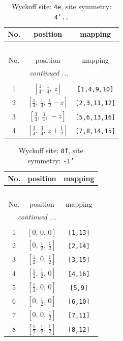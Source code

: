 \documentclass[fleqn,8pt]{jsarticle}
\begin{document}
\renewcommand{\arraystretch}{1.2}
\begin{longtable}{ccc}
\caption{Wyckoff site: {\tt 4e}, site symmetry: {\tt 4'..}}
 \\
 \hline \hline
No. & position & mapping \\ \hline \endfirsthead

\multicolumn{2}{l}{\tablename\ \thetable{}} \\
 \hline \hline
No. & position & mapping \\ \hline \endhead

 \hline \hline
\multicolumn{2}{r}{\footnotesize\it continued ...} \\ \endfoot

 \hline \hline
\multicolumn{2}{r}{} \\ \endlastfoot

1 & $\left[ \frac{1}{4},\, \frac{1}{4},\, z \right]$ & {\tt [1,4,9,10]} \\ \hline
2 & $\left[ \frac{1}{4},\, \frac{1}{4},\, \frac{1}{2} - z \right]$ & {\tt [2,3,11,12]} \\ \hline
3 & $\left[ \frac{3}{4},\, \frac{3}{4},\, - z \right]$ & {\tt [5,6,13,16]} \\ \hline
4 & $\left[ \frac{3}{4},\, \frac{3}{4},\, z + \frac{1}{2} \right]$ & {\tt [7,8,14,15]} \\
\end{longtable}
\renewcommand{\arraystretch}{1.2}
\begin{longtable}{ccc}
\caption{Wyckoff site: {\tt 8f}, site symmetry: {\tt -1'}}
 \\
 \hline \hline
No. & position & mapping \\ \hline \endfirsthead

\multicolumn{2}{l}{\tablename\ \thetable{}} \\
 \hline \hline
No. & position & mapping \\ \hline \endhead

 \hline \hline
\multicolumn{2}{r}{\footnotesize\it continued ...} \\ \endfoot

 \hline \hline
\multicolumn{2}{r}{} \\ \endlastfoot

1 & $\left[ 0,\, 0,\, 0 \right]$ & {\tt [1,13]} \\ \hline
2 & $\left[ 0,\, \frac{1}{2},\, \frac{1}{2} \right]$ & {\tt [2,14]} \\ \hline
3 & $\left[ \frac{1}{2},\, 0,\, \frac{1}{2} \right]$ & {\tt [3,15]} \\ \hline
4 & $\left[ \frac{1}{2},\, \frac{1}{2},\, 0 \right]$ & {\tt [4,16]} \\ \hline
5 & $\left[ \frac{1}{2},\, 0,\, 0 \right]$ & {\tt [5,9]} \\ \hline
6 & $\left[ 0,\, \frac{1}{2},\, 0 \right]$ & {\tt [6,10]} \\ \hline
7 & $\left[ 0,\, 0,\, \frac{1}{2} \right]$ & {\tt [7,11]} \\ \hline
8 & $\left[ \frac{1}{2},\, \frac{1}{2},\, \frac{1}{2} \right]$ & {\tt [8,12]} \\
\end{longtable}
\end{document}
